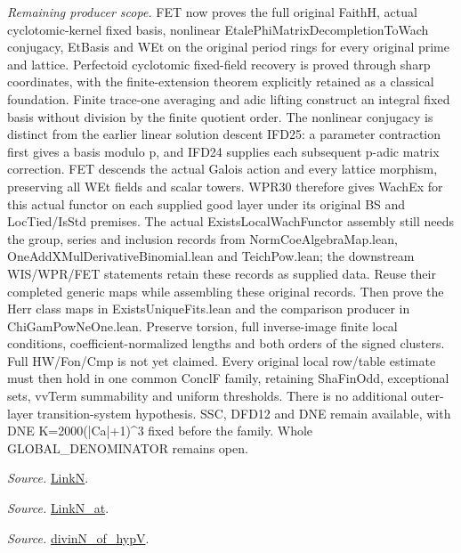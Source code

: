 \documentclass[11pt,a4paper]{article}
\numberwithin{equation}{section}
\theoremstyle{remark}\newtheorem{remark}[theorem]{Remark}
\begin{document}
\emph{Remaining producer scope.} FET now proves the full original FaithH, actual cyclotomic-kernel fixed basis, nonlinear EtalePhiMatrixDecompletionToWach conjugacy, EtBasis and WEt on the original period rings for every original prime and lattice. Perfectoid cyclotomic fixed-field recovery is proved through sharp coordinates, with the finite-extension theorem explicitly retained as a classical foundation. Finite trace-one averaging and adic lifting construct an integral fixed basis without division by the finite quotient order. The nonlinear conjugacy is distinct from the earlier linear solution descent IFD25: a parameter contraction first gives a basis modulo p, and IFD24 supplies each subsequent p-adic matrix correction. FET descends the actual Galois action and every lattice morphism, preserving all WEt fields and scalar towers. WPR30 therefore gives WachEx for this actual functor on each supplied good layer under its original BS and LocTied/IsStd premises. The actual ExistsLocalWachFunctor assembly still needs the group, series and inclusion records from NormCoeAlgebraMap.lean, OneAddXMulDerivativeBinomial.lean and TeichPow.lean; the downstream WIS/WPR/FET statements retain these records as supplied data. Reuse their completed generic maps while assembling these original records. Then prove the Herr class maps in ExistsUniqueFits.lean and the comparison producer in ChiGamPowNeOne.lean. Preserve torsion, full inverse-image finite local conditions, coefficient-normalized lengths and both orders of the signed clusters. Full HW/Fon/Cmp is not yet claimed. Every original local row/table estimate must then hold in one common ConclF family, retaining ShaFinOdd, exceptional sets, vvTerm summability and uniform thresholds. There is no additional outer-layer transition-system hypothesis. SSC, DFD12 and DNE remain available, with DNE K=2000(|Ca|+1)\textasciicircum{}3 fixed before the family. Whole GLOBAL\_\allowbreak DENOMINATOR remains open.

\emph{Source.} \href{https://github.com/CocoSgt/riemann-hypothesis-lean/blob/7cbf7a0c32fca1badf05931879a37c3f8a2b03b4/src/Formalism/SharpRestriction/GlobalTheoremInputs.lean#L45-L48}{LinkN}.

\emph{Source.} \href{https://github.com/CocoSgt/riemann-hypothesis-lean/blob/7cbf7a0c32fca1badf05931879a37c3f8a2b03b4/src/Formalism/SharpRestriction/GlobalTheoremInputs.lean#L40-L44}{LinkN\_\allowbreak at}.

\emph{Source.} \href{https://github.com/CocoSgt/riemann-hypothesis-lean/blob/7cbf7a0c32fca1badf05931879a37c3f8a2b03b4/src/Development/AutomorphicArithmetic/CharacterBoxes/DivinNOfHypV.lean#L117-L134}{divinN\_\allowbreak of\_\allowbreak hypV}.
\end{document}
